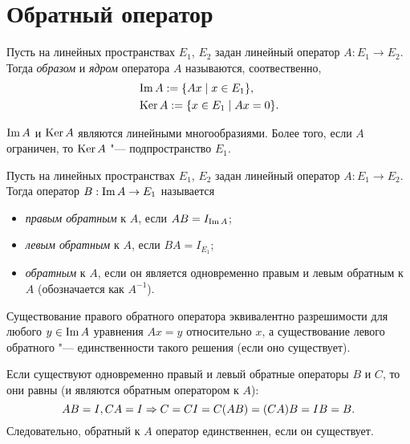 \documentclass[main]{subfiles}
\begin{document}
\section{Обратный оператор}

\begin{definition}
  Пусть на линейных пространствах \( E_1 \), \( E_2 \)
  задан линейный оператор \( A : E_1 \to E_2 \).
  Тогда \emph{образом} и \emph{ядром} оператора \( A \)
  называются, соотвественно,
  \begin{align}
    &\operatorname{Im} A := \{ A x \mid x \in E_1 \}, \\
    &\operatorname{Ker} A := \{ x \in E_1 \mid A x = 0 \}.
  \end{align}
\end{definition}

\begin{remark}
  \( \operatorname{Im} A \) и \( \operatorname{Ker} A \)
  являются линейными многообразиями.
  Более того, если \( A \) ограничен, то
  \( \operatorname{Ker} A \) "--- подпространство \( E_1 \).
\end{remark}

\begin{definition}
  Пусть на линейных пространствах \( E_1 \), \( E_2 \)
  задан линейный оператор \( A : E_1 \to E_2 \).
  Тогда оператор \( B : \operatorname{Im} A \to E_1 \) называется
  \begin{itemize}
    \item \emph{правым обратным} к \( A \),
      если \( AB = I_{\operatorname{Im} A} \);
    \item \emph{левым обратным} к \( A \),
      если \( BA = I_{E_1} \);
    \item \emph{обратным} к \( A \),
      если он является одновременно правым и левым обратным
      к \( A \) (обозначается как \( A^{-1} \)).
  \end{itemize}
\end{definition}

\begin{remark}
  Существование правого обратного оператора эквивалентно
  разрешимости для любого \( y \in \operatorname{Im} A \)
  уравнения \( A x = y \) относительно \( x \),
  а существование левого обратного "---
  единственности такого решения (если оно существует).
\end{remark}

\begin{remark}
  Если существуют одновременно
  правый и левый обратные операторы
  \( B \) и \( C \),
  то они равны
  (и являются обратным оператором к \( A \)):
  \[
    AB = I, CA = I \Rightarrow
    C = C I = C (AB) = (CA) B = I B = B.
  \]
  Следовательно, обратный к \( A \) оператор
  единственнен, если он существует.
\end{remark}
\end{document}
